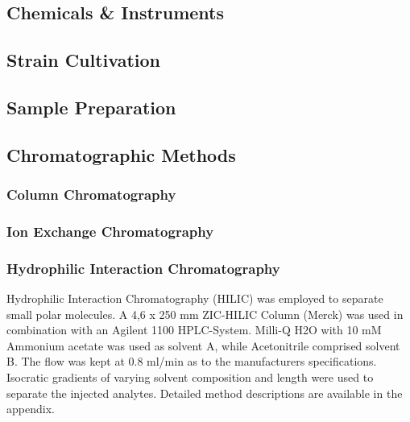 \subsection{Chemicals \& Instruments} %
\label{sec:chemicals_&_instruments}

\subsection{Strain Cultivation} %
\label{sec:strain_cultivation}

\subsection{Sample Preparation} %
\label{sec:sample_preparation}

\subsection{Chromatographic Methods} %
\label{sec:chromatographic_methods}

\subsubsection{Column Chromatography} %
\label{sub:column_chromatography}

\subsubsection{Ion Exchange Chromatography} %
\label{sub:ion_exchange_chromatography}

\subsubsection{Hydrophilic Interaction Chromatography} %
\label{ssub:hilic}

Hydrophilic Interaction Chromatography (HILIC) was employed to separate small polar molecules. A   4,6 x 250 mm ZIC-HILIC Column (Merck) was used in combination with an Agilent 1100 HPLC-System.
Milli-Q H2O with 10 mM Ammonium acetate was used as solvent A, while Acetonitrile comprised solvent B. The flow was kept at 0.8 ml/min as to the manufacturers specifications. Isocratic gradients of varying solvent composition and length were used to separate the injected analytes. Detailed method descriptions are available in the appendix.

